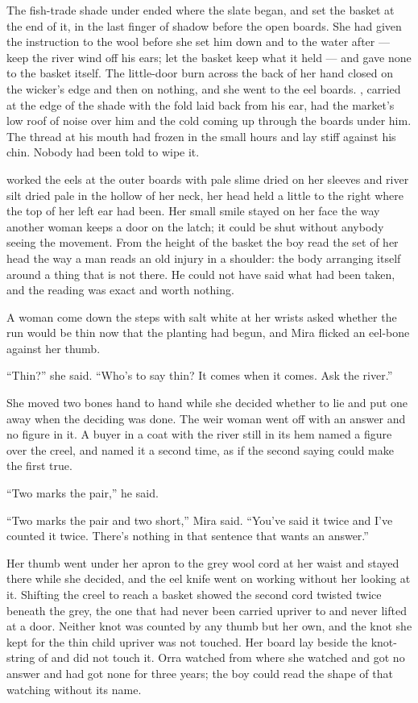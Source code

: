 
The fish-trade shade under  ended where the slate began, and  set the basket at the end of it, in the last finger of shadow before the open boards. She had given the instruction to the wool before she set him down and to the water after --- keep the river wind off his ears; let the basket keep what it held --- and gave none to the basket itself. The little-door burn across the back of her hand closed on the wicker's edge and then on nothing, and she went to the eel boards. , carried at the edge of the shade with the fold laid back from his ear, had the market's low roof of noise over him and the cold coming up through the boards under him. The thread at his mouth had frozen in the small hours and lay stiff against his chin. Nobody had been told to wipe it.

 worked the eels at the outer boards with pale slime dried on her sleeves and river silt dried pale in the hollow of her neck, her head held a little to the right where the top of her left ear had been. Her small smile stayed on her face the way another woman keeps a door on the latch; it could be shut without anybody seeing the movement. From the height of the basket the boy read the set of her head the way a man reads an old injury in a shoulder: the body arranging itself around a thing that is not there. He could not have said what had been taken, and the reading was exact and worth nothing.

A woman come down the steps with salt white at her wrists asked whether the run would be thin now that the planting had begun, and Mira flicked an eel-bone against her thumb.

“Thin?” she said. “Who's to say thin? It comes when it comes. Ask the river.”

She moved two bones hand to hand while she decided whether to lie and put one away when the deciding was done. The weir woman went off with an answer and no figure in it. A buyer in a coat with the river still in its hem named a figure over the creel, and named it a second time, as if the second saying could make the first true.

“Two marks the pair,” he said.

“Two marks the pair and two short,” Mira said. “You've said it twice and I've counted it twice. There's nothing in that sentence that wants an answer.”

Her thumb went under her apron to the grey wool cord at her waist and stayed there while she decided, and the eel knife went on working without her looking at it. Shifting the creel to reach a basket showed the second cord twisted twice beneath the grey, the one that had never been carried upriver to  and never lifted at a door. Neither knot was counted by any thumb but her own, and the knot she kept for the thin child upriver was not touched. Her board lay beside the knot-string of  and did not touch it. Orra watched from where she watched and got no answer and had got none for three years; the boy could read the shape of that watching without its name.

